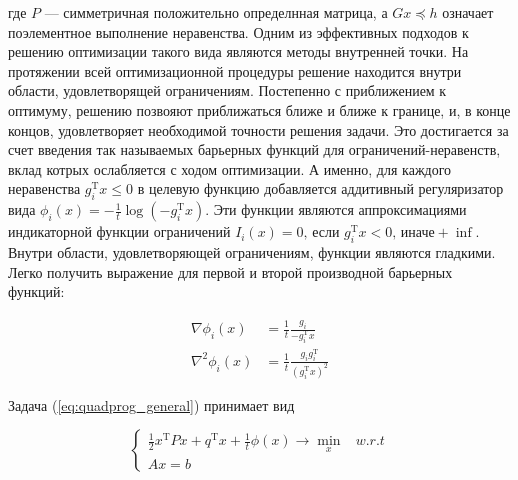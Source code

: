 где $P$ --- симметричная положительно определнная матрица, а $Gx \preceq h$ означает поэлементное выполнение неравенства.
Одним из эффективных подходов к решению оптимизации такого вида являются методы внутренней точки.
На протяжении всей оптимизационной процедуры решение находится внутри области, удовлетворящей ограничениям.
Постепенно с приближением к оптимуму, решению позвояют приближаться ближе и ближе к границе, и, в конце концов, удовлетворяет необходимой точности решения задачи.
Это достигается за счет введения так называемых барьерных функций для ограничений-неравенств, вклад котрых ослабляется с ходом оптимизации.
А именно, для каждого неравенства $g_i^\mathrm{T}x \leq 0$ в целевую функцию добавляется аддитивный регуляризатор вида $\phi_i(x) = -\frac 1 t \log{\left(- g_i^\mathrm{T}x \right)}$.
Эти функции являются аппроксимациями индикаторной функции ограничений $I_i(x) = 0 \text{, если } g_i^\mathrm{T}x < 0 \text{, иначе} +\inf$.
Внутри области, удовлетворяющей ограничениям, функции являются гладкими.
Легко получить выражение для первой и второй производной барьерных функций:

\begin{equation} 
\label{eq:barrier_grads}
\begin{split}
  \nabla \phi_i(x) &= \frac 1 t \frac {g_i}{-g_i^\mathrm{T}x} \\
  \nabla^2 \phi_i(x) &= \frac 1 t \frac {g_i g_i^\mathrm{T}} {\left( g_i^\mathrm{T}x \right)^2}
\end{split}
\end{equation}

Задача (\ref{eq:quadprog_general}) принимает вид

\begin{equation}
  \label{eq:quadprog_barrier}
  \begin{cases}
  \frac 1 2 x^\mathrm{T}Px + q^\mathrm{T}x + \frac 1 t \phi(x) \rightarrow \min\limits_x & w.r.t \\
  Ax = b\,
  \end{cases}
\end{equation}

